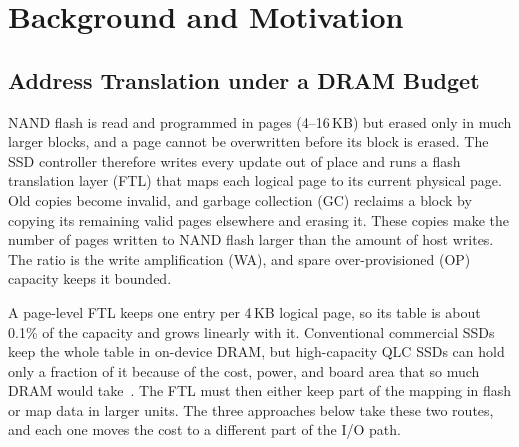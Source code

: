 
\section{Background and Motivation}
\label{sec:bg}

\subsection{Address Translation under a DRAM Budget}
NAND flash is read and programmed in pages (4--16\,KB) but erased only in
much larger blocks, and a page cannot be overwritten before its block is
erased. The SSD controller therefore writes every update out of place and runs
a flash translation layer (FTL) that maps each logical page to its current
physical page. Old copies become invalid, and garbage collection (GC)
reclaims a block by copying its remaining valid pages elsewhere and erasing it.
These copies make the number of pages written to NAND flash larger than the
amount of host writes. The ratio is the write amplification (WA), and spare
over-provisioned (OP) capacity keeps it bounded.

A page-level FTL keeps one entry per 4\,KB logical page, so its table is
about 0.1\% of the capacity and grows linearly with it. Conventional commercial
SSDs keep the whole table in on-device DRAM, but high-capacity QLC SSDs can
hold only a fraction of it because of the cost, power, and
board area that so much DRAM would take~\cite{micron-iu}. The FTL must then
either keep part of the mapping in flash or map data in larger units. The
three approaches below take these two routes, and each one moves the cost to a
different part of the I/O path.


